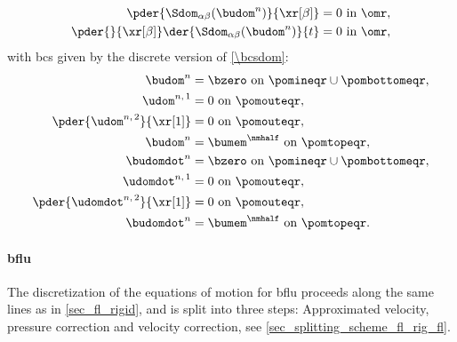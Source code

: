 \begin{align}
        \label{eq_domain_fluid_rigid_disc}
        \pder{\Sdom_{\alpha \beta}(\budom^n)}{\xr[\beta]}          & = 0 \text{ in } \omr, \\
        \label{eq_domain_fluid_rigid_disc_dot}
        \pder{}{\xr[\beta]}\der{\Sdom_{\alpha \beta}(\budom^n)}{t} & = 0 \text{ in } \omr,
\end{align}
with \acp{bc} given by the discrete version of \cref{\bcsdom}:
\begin{align}
        \label{bc_fl_mem_dom_1_disc}
        \budom^n                          & = \bzero \text{ on } \pomineqr \cup \pombottomeqr, \\
        \label{bc_fl_mem_dom_2_disc}
        \udom^{n, \, 1}                   & = 0 \text{ on } \pomouteqr,                        \\
        \label{bc_fl_mem_dom_3_disc}
        \pder{\udom^{n, \, 2}}{\xr[1]}    & = 0 \text{ on } \pomouteqr,                        \\
        \label{bc_fl_mem_dom_4_disc}
        \budom^n                          & = \bumem^{\nmhalf} \text{ on } \pomtopeqr,         \\
        \label{bc_fl_mem_dom_5_disc}
        \budomdot^n                       & = \bzero \text{ on } \pomineqr \cup \pombottomeqr, \\
        \label{bc_fl_mem_dom_6_disc}
        \udomdot^{n, \, 1}                & = 0 \text{ on } \pomouteqr,                        \\
        \label{bc_fl_mem_dom_7_disc}
        \pder{\udomdot^{n, \, 2}}{\xr[1]} & = 0 \text{ on } \pomouteqr,                        \\
        \label{bc_fl_mem_dom_8_disc}
        \budomdot^n                       & = \bumem^{\nmhalf} \text{ on } \pomtopeqr.
\end{align}



\paragraph{\Acl{bflu}}\label{sec_temp_discretization_mem_bflu}


The discretization of the equations of motion for  \ac{bflu} proceeds along the same lines as in \cref{sec_fl_rigid}, and is split into three steps: Approximated velocity, pressure correction and velocity correction, see \cref{sec_splitting_scheme_fl_rig_fl}.



